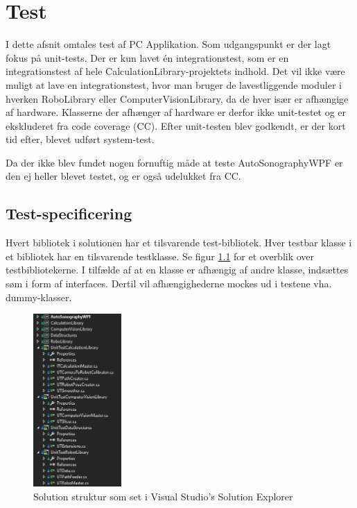 \chapter{Test}\label{Test}
I dette afsnit omtales test af PC Applikation. Som udgangspunkt er der lagt fokus på unit-tests. Der er kun lavet én integrationstest, som er en integrationstest af hele CalculationLibrary-projektets indhold. Det vil ikke være muligt at lave en integrationstest, hvor man bruger de lavestliggende moduler i hverken RoboLibrary eller ComputerVisionLibrary, da de hver især er afhængige af hardware. Klasserne der afhænger af hardware er derfor ikke unit-testet og er ekskluderet fra code coverage (CC). 
Efter unit-testen blev godkendt, er der kort tid efter, blevet udført system-test.

Da der ikke blev fundet nogen fornuftig måde at teste AutoSonographyWPF er den ej heller blevet testet, og er også udelukket fra CC.

\section{Test-specificering}
Hvert bibliotek i solutionen har et tilsvarende test-bibliotek. Hver testbar klasse i et bibliotek har en tilsvarende testklasse. Se figur \ref{SolutionStructure} for et overblik over testbibliotekerne. I tilfælde af at en klasse er afhængig af andre klasse, indsættes søm i form af interfaces. Dertil vil afhængighederne mockes ud i testene vha. dummy-klasser.

\begin{figure}[H]
    \centering
    \includegraphics[width=0.3\textwidth]{figurer/d/Test/solution_overview}
    \caption{Solution struktur som set i Visual Studio's Solution Explorer}
    \label{SolutionStructure}
\end{figure}

